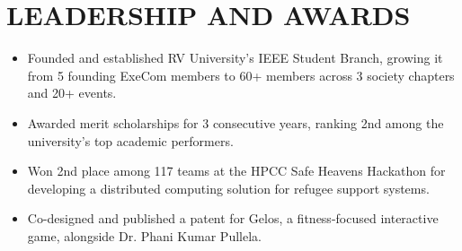 \section*{LEADERSHIP AND AWARDS}
\begin{itemize}
  \item Founded and established RV University's IEEE Student Branch, growing it from 5 founding ExeCom members to 60+ members across 3 society chapters and 20+ events.
  \item Awarded merit scholarships for 3 consecutive years, ranking 2nd among the university's top academic performers.
  \item Won 2nd place among 117 teams at the HPCC Safe Heavens Hackathon for developing a distributed computing solution for refugee support systems.
   \item Co-designed and published a patent for Gelos, a fitness-focused interactive game, alongside Dr. Phani Kumar Pullela. %
\end{itemize}